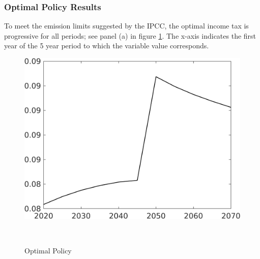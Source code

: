 \subsubsection{Optimal Policy Results}\label{sec:optres}
To meet the emission limits suggested by the IPCC, the optimal income tax is progressive for all periods; see panel (a) in figure \ref{fig:optPol}.  The x-axis indicates the first year of the 5 year period to which the variable value corresponds. 
\begin{figure}[h!!]
	\centering
	\caption{Optimal Policy }\label{fig:optPol}
	\begin{minipage}[]{0.32\textwidth}
		\includegraphics[width=1\textwidth]{../../codding_model/own_basedOnFried/optimalPol_010922_revision/figures/all_13Sept22_Tplus30/Single_OPT_T_NoTaus_taul_regime0_spillover0_knspil0_noskill0_sep0_xgrowth0_extern0_PV1_sizeequ0_GOV0_etaa0.79.png}
	\end{minipage}
\begin{minipage}[]{0.1\textwidth}
	\
\end{minipage}
	\begin{minipage}[]{0.32\textwidth}

\end{minipage}
\end{figure}
